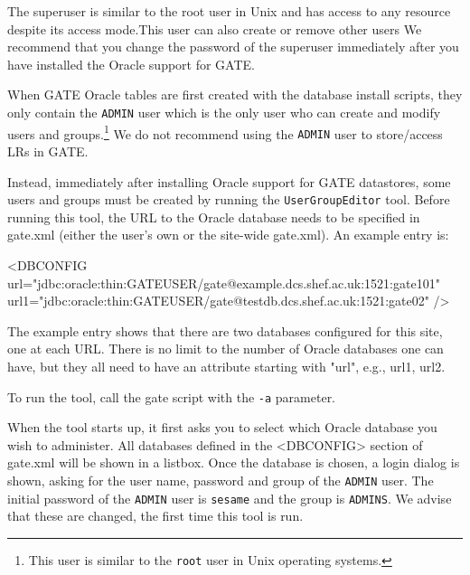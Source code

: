 The superuser is similar to the root user in Unix and has access
to any resource despite its access mode.This user can also create
or remove other users We recommend that you change the password of
the superuser immediately after you have installed the Oracle
support for GATE.



When GATE Oracle tables are first created with the database
install scripts, they only contain the {\tt ADMIN} user which is
the only user who can create and modify users and
groups.\footnote{This user is similar to the {\tt root} user in
Unix operating systems.} We do not recommend using the {\tt ADMIN}
user to store/access LRs in GATE.

Instead, immediately after installing Oracle support for GATE
datastores, some users and groups must be created by running the
{\tt UserGroupEditor} tool. Before running this tool, the URL to
the Oracle database needs to be specified in gate.xml (either the
user's own or the site-wide gate.xml). An example entry is:

<DBCONFIG
  url="jdbc:oracle:thin:GATEUSER/gate@example.dcs.shef.ac.uk:1521:gate101"
  url1="jdbc:oracle:thin:GATEUSER/gate@testdb.dcs.shef.ac.uk:1521:gate02"
/>

The example entry shows that there are two databases configured
for this site, one at each URL. There is no limit to the number of
Oracle databases one can have, but they all need to have an
attribute starting with "url", e.g., url1, url2.

To run the tool, call the gate script with the {\tt -a} parameter.

When the tool starts up, it first asks you to select which Oracle
database you wish to administer. All databases defined in the
<DBCONFIG> section of gate.xml will be shown in a listbox. Once
the database is chosen, a login dialog is shown, asking for the
user name, password and group of the {\tt ADMIN} user. The initial
password of the {\tt ADMIN} user is {\tt sesame} and the group is
{\tt ADMINS}. We advise that these are changed, the first time
this tool is run.

